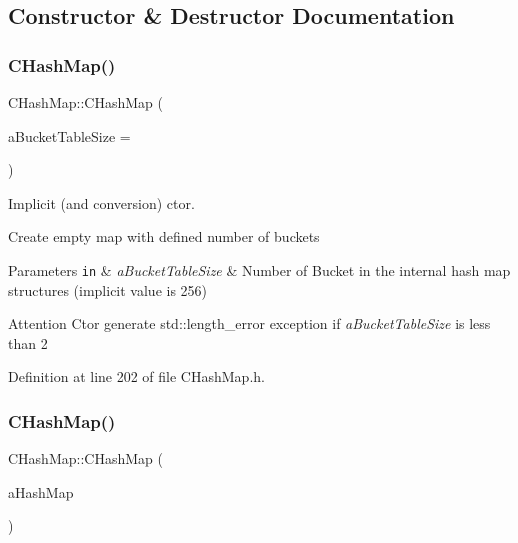 \subsection{Constructor \& Destructor Documentation}
\mbox{\label{class_c_hash_map_a40555c434d29ed0942ad03d41df3596d}} 
\subsubsection{\texorpdfstring{C\+Hash\+Map()}{CHashMap()}\hspace{0.1cm}{\footnotesize\ttfamily [1/3]}}
{\footnotesize\ttfamily C\+Hash\+Map\+::\+C\+Hash\+Map (\begin{DoxyParamCaption}\item[{size\+\_\+t}]{a\+Bucket\+Table\+Size = {} }\end{DoxyParamCaption})\hspace{0.3cm}{\ttfamily [inline]}}



Implicit (and conversion) c\textquotesingle{}tor. 

Create empty map with defined number of buckets 
\begin{DoxyParams}[1]{Parameters}
\mbox{\tt in}  & {\em a\+Bucket\+Table\+Size} & Number of Bucket in the internal hash map structures (implicit value is 256) \\
\hline
\end{DoxyParams}
\begin{DoxyAttention}{Attention}
C\textquotesingle{}tor generate {\ttfamily std\+::length\+\_\+error} exception if {\itshape a\+Bucket\+Table\+Size} is less than 2 
\end{DoxyAttention}


Definition at line 202 of file C\+Hash\+Map.\+h.

\mbox{\label{class_c_hash_map_afe589de62e80dde1ecf3fb606ce1a71f}} 
\subsubsection{\texorpdfstring{C\+Hash\+Map()}{CHashMap()}\hspace{0.1cm}{\footnotesize\ttfamily [2/3]}}
{\footnotesize\ttfamily C\+Hash\+Map\+::\+C\+Hash\+Map (\begin{DoxyParamCaption}\item[{const \hyperlink{class_c_hash_map}{C\+Hash\+Map} \&}]{a\+Hash\+Map }\end{DoxyParamCaption})}



